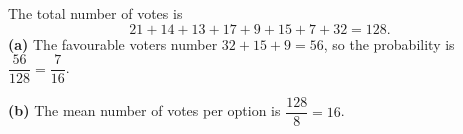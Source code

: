 The total number of votes is
\[
21+14+13+17+9+15+7+32=128 .
\]
\textbf{(a)} The favourable voters number \(32+15+9=56\), so the probability is \(\dfrac{56}{128}=\boxed{\dfrac{7}{16}}\).

\textbf{(b)} The mean number of votes per option is \(\dfrac{128}{8}=\boxed{16}\).
